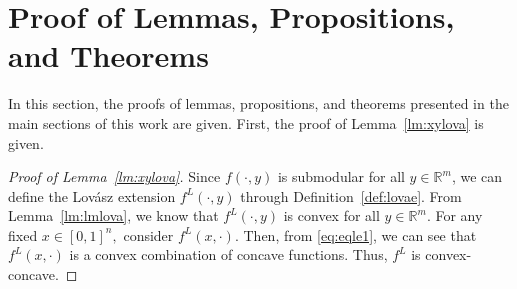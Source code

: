 \documentclass{article}
\theoremstyle{plain}
\theoremstyle{definition}
\theoremstyle{remark}
\newcommand{\R}{\mathbb{R}}
\begin{document}
\section{Proof of Lemmas, Propositions, and Theorems}\label{app:proof}
In this section, the proofs of lemmas, propositions, and theorems presented in the main sections of this work are given.
First, the proof of Lemma~\ref{lm:xylova} is given.
\begin{proof}[Proof of Lemma~\ref{lm:xylova}]
     Since $f(\cdot,y)$ is submodular %
     for all $y\in \R^m$, we can define the %
     Lovász extension $f^L(\cdot,y)$
     through Definition~\ref{def:lovae}. From Lemma~\ref{lm:lmlova}, we know that $f^L(\cdot,y)$ %
     is convex for all $y\in \R^m$. 
    For any fixed $x\in[0,1]^n,$  consider $f^L(x,\cdot).$ Then, from \eqref{eq:eqle1}, we can see that $f^L(x,\cdot)$ is a convex combination of concave functions. Thus, $f^L$ is convex-concave. 


\end{proof}
\end{document}
